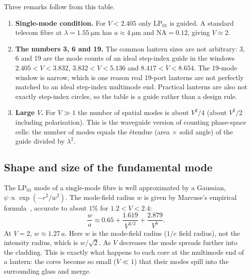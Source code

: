 \documentclass[11pt,a4paper]{article}
\begin{document}
Three remarks follow from this table.
\begin{enumerate}
\item \textbf{Single-mode condition.} For $V < 2.405$ only $\mathrm{LP}_{01}$ is guided. A standard telecom fibre at $\lambda = \SI{1.55}{\micro\meter}$ has $a \approx \SI{4}{\micro\meter}$ and $\mathrm{NA} = 0.12$, giving $V \approx 2$.
\item \textbf{The numbers 3, 6 and 19.} The common lantern sizes are not arbitrary: 3, 6 and 19 are the mode counts of an ideal step-index guide in the windows $2.405 < V < 3.832$, $3.832 < V < 5.136$ and $8.417 < V < 8.654$. The 19-mode window is narrow, which is one reason real 19-port lanterns are not perfectly matched to an ideal step-index multimode end. Practical lanterns are also not exactly step-index circles, so the table is a guide rather than a design rule.
\item \textbf{Large $V$.} For $V \gg 1$ the number of spatial modes is about $V^2/4$ (about $V^2/2$ including polarisation). This is the waveguide version of counting phase-space cells: the number of modes equals the \'etendue (area $\times$ solid angle) of the guide divided by $\lambda^2$.
\end{enumerate}

\subsection{Shape and size of the fundamental mode}
The $\mathrm{LP}_{01}$ mode of a single-mode fibre is well approximated by a Gaussian, $\psi \propto \exp(-r^2/w^2)$. The mode-field radius $w$ is given by Marcuse's empirical formula~\cite{Marcuse1977}, accurate to about $1\%$ for $1.2 < V < 2.4$:
\begin{equation}
\frac{w}{a} \approx 0.65 + \frac{1.619}{V^{3/2}} + \frac{2.879}{V^6}.
\label{eq:marcuse}
\end{equation}
At $V = 2$, $w \approx 1.27\,a$. Here $w$ is the mode-field radius ($1/e$ field radius), not the intensity radius, which is $w/\sqrt{2}$. As $V$ decreases the mode spreads further into the cladding. This is exactly what happens to each core at the multimode end of a lantern: the cores become so small ($V \ll 1$) that their modes spill into the surrounding glass and merge.
\end{document}
